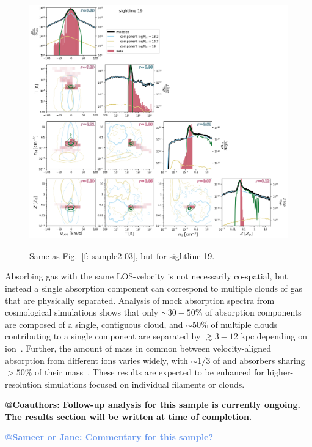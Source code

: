\documentclass[fleqn,usenatbib]{mnras}
\makeatletter
\newcommand{\note}[1]{\textbf{@Coauthors: #1}}
\newcommand{\atsameer}[1]{\textcolor{CornflowerBlue}{\textbf{@Sameer or Jane: #1}}}
\makeatother
\begin{document}
\begin{figure}
    \centering
    \includegraphics[width=\textwidth]{figures/sample2/sightline_0019.png}
    \label{f: sample2 19}
    \caption{Same as Fig.~\ref{f: sample2 03}, but for sightline 19.}
\end{figure}

Absorbing gas with the same LOS-velocity is not necessarily co-spatial, but instead a single absorption component can correspond to multiple clouds of gas that are physically separated.
Analysis of mock absorption spectra from cosmological simulations shows that only $\sim 30-50\%$ of absorption components are composed of a single, contiguous cloud, and $\sim 50\%$ of multiple clouds contributing to a single component are separated by $\gtrsim 3-12$ kpc depending on ion~\citep[][]{Marra2022}.
Further, the amount of mass in common between velocity-aligned absorption from different ions varies widely, with $\sim 1/3$ of  and  absorbers sharing $>50\%$ of their mass~\citep[][]{Marra2022}.
These results are expected to be enhanced for higher-resolution simulations focused on individual filaments or clouds.

\note{
Follow-up analysis for this sample is currently ongoing.
The results section will be written at time of completion.
}

\atsameer{Commentary for this sample?}
\end{document}
